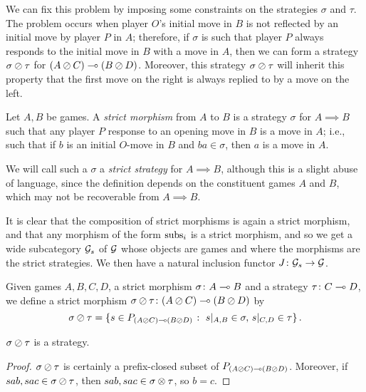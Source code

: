 We can fix this problem by imposing some constraints on the strategies $\sigma$ and $\tau$.  
The problem occurs when player $O$'s initial move in $B$ is not reflected by an initial move by player $P$ in $A$; therefore, if $\sigma$ is such that player $P$ always responds to the initial move in $B$ with a move in $A$, then we can form a strategy $\sigma\oslash\tau$ for $(A\oslash C)\multimap (B\oslash D)$.  
Moreover, this strategy $\sigma\oslash\tau$ will inherit this property that the first move on the right is always replied to by a move on the left.

\begin{definition}
  Let $A,B$ be games.  
  A \emph{strict morphism} from $A$ to $B$ is a strategy $\sigma$ for $A\implies B$ such that any player $P$ response to an opening move in $B$ is a move in $A$; i.e., such that if $b$ is an initial $O$-move in $B$ and $ba\in\sigma$, then $a$ is a move in $A$.
\end{definition}

We will call such a $\sigma$ a \emph{strict strategy} for $A\implies B$, although this is a slight abuse of language, since the definition depends on the constituent games $A$ and $B$, which may not be recoverable from $A\implies B$.

It is clear that the composition of strict morphisms is again a strict morphism, and that any morphism of the form $\operatorname{subs}_i$ is a strict morphism, and so we get a wide subcategory $\mathcal G_s$ of $\mathcal G$ whose objects are games and where the morphisms are the strict strategies.
We then have a natural inclusion functor $J\colon \mathcal G_s\to \mathcal G$.  

\begin{definition}
  Given games $A,B,C,D$, a strict morphism $\sigma\colon A \multimap B$ and a strategy $\tau\colon C\multimap D$, we define a strict morphism $\sigma\oslash\tau\colon (A \oslash C)\multimap (B \oslash D)$ by
  \[
    \sigma\oslash\tau = \{s\in P_{(A\oslash C)\multimap (B\oslash D)}\;\colon\; s\vert_{A,B}\in\sigma,\,s\vert_{C,D}\in\tau\}\,.
    \]
  \label{DefSequoidOfStrategies}
\end{definition}

\begin{proposition}
  $\sigma\oslash\tau$ is a strategy.  
\end{proposition}
\begin{proof}
  $\sigma\oslash\tau$ is certainly a prefix-closed subset of $P_{(A\oslash C)\multimap (B\oslash D)}$.  
  Moreover, if $sab,sac\in\sigma\oslash\tau$, then $sab,sac\in\sigma\otimes\tau$, so $b=c$.  
\end{proof}

